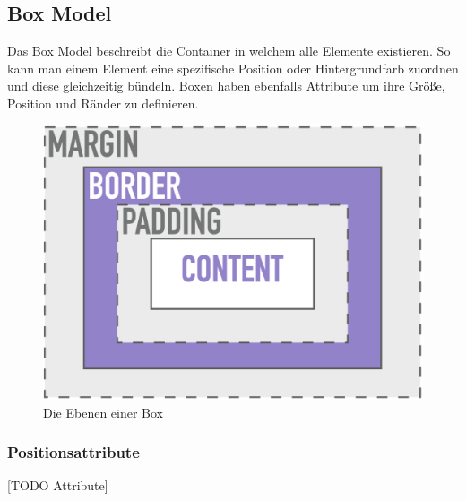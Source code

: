 \documentclass{article}
\begin{document}
	\subsection{Box Model}
	Das Box Model beschreibt die Container in welchem alle Elemente existieren. So kann man einem Element eine spezifische Position oder Hintergrundfarb zuordnen und diese gleichzeitig bündeln. Boxen haben ebenfalls Attribute um ihre Größe, Position und Ränder zu definieren.
	\begin{figure}[H]
	\centering
	\includegraphics{Bilder/box.png}
	\caption{Die Ebenen einer Box}
	\end{figure}
	
	\subsubsection{Positionsattribute}
	[TODO Attribute]
\end{document}

